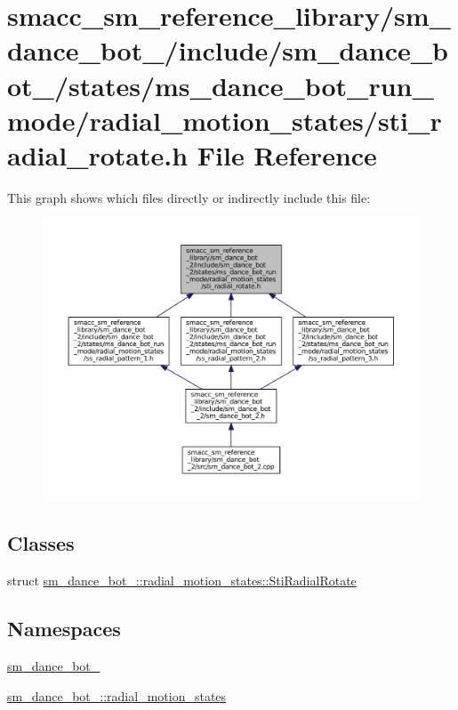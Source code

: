 \hypertarget{sm__dance__bot__2_2include_2sm__dance__bot__2_2states_2ms__dance__bot__run__mode_2radial__motionbfe5ab8b355a3d948f17369807f22660}{}\section{smacc\+\_\+sm\+\_\+reference\+\_\+library/sm\+\_\+dance\+\_\+bot\+\_/include/sm\+\_\+dance\+\_\+bot\+\_/states/ms\+\_\+dance\+\_\+bot\+\_\+run\+\_\+mode/radial\+\_\+motion\+\_\+states/sti\+\_\+radial\+\_\+rotate.h File Reference}
\label{sm__dance__bot__2_2include_2sm__dance__bot__2_2states_2ms__dance__bot__run__mode_2radial__motionbfe5ab8b355a3d948f17369807f22660}
This graph shows which files directly or indirectly include this file\+:
\nopagebreak
\begin{figure}[H]
\begin{center}
\leavevmode
\includegraphics[width=350pt]{sm__dance__bot__2_2include_2sm__dance__bot__2_2states_2ms__dance__bot__run__mode_2radial__motioncc9db1ac5ebdbb6dc4547e57c78fd444}
\end{center}
\end{figure}
\subsection*{Classes}
\begin{DoxyCompactItemize}
\item 
struct \hyperlink{structsm__dance__bot__2_1_1radial__motion__states_1_1StiRadialRotate}{sm\+\_\+dance\+\_\+bot\+\_\+::radial\+\_\+motion\+\_\+states\+::\+Sti\+Radial\+Rotate}
\end{DoxyCompactItemize}
\subsection*{Namespaces}
\begin{DoxyCompactItemize}
\item 
 \hyperlink{namespacesm__dance__bot__2}{sm\+\_\+dance\+\_\+bot\+\_}
\item 
 \hyperlink{namespacesm__dance__bot__2_1_1radial__motion__states}{sm\+\_\+dance\+\_\+bot\+\_\+::radial\+\_\+motion\+\_\+states}
\end{DoxyCompactItemize}
